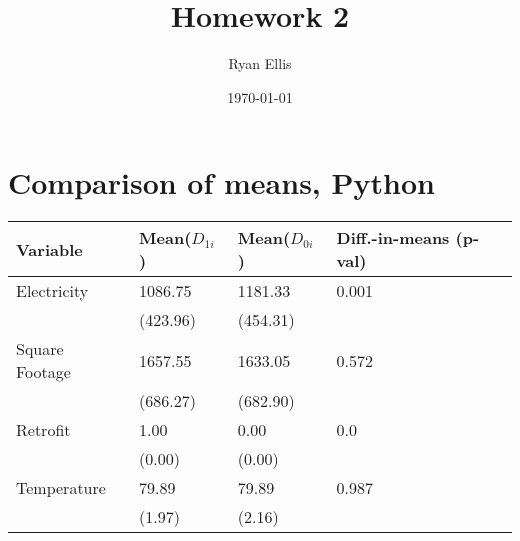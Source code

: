 \documentclass{article}
\title{Homework 2}
\author{Ryan Ellis}
\date{\today}
\begin{document}
  
\maketitle

\section{Comparison of means, Python}

\begin{longtable}{llll}
\hline
 Variable       & Mean($D_{1i}$)   & Mean($D_{0i}$)   & Diff.-in-means (p-val)   \\
\hline
\endhead
 Electricity    & 1086.75                 & 1181.33               & 0.001                          \\
                & (423.96)                & (454.31)              &                                \\
 Square Footage & 1657.55                 & 1633.05               & 0.572                          \\
                & (686.27)                & (682.90)              &                                \\
 Retrofit       & 1.00                    & 0.00                  & 0.0                            \\
                & (0.00)                  & (0.00)                &                                \\
 Temperature    & 79.89                   & 79.89                 & 0.987                          \\
                & (1.97)                  & (2.16)                &                                \\
\hline
\end{longtable}
\end{document}
